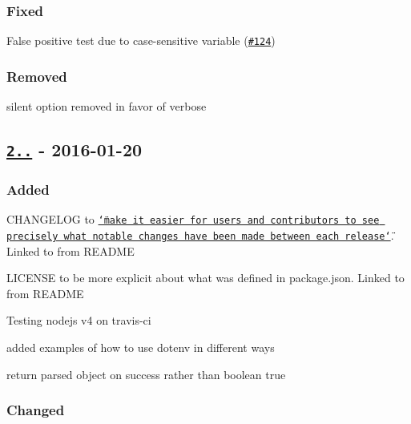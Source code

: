 \subsubsection*{Fixed}


\begin{DoxyItemize}
\item False positive test due to case-\/sensitive variable (\href{https://github.com/motdotla/dotenv/pull/124}{\tt \#124})
\end{DoxyItemize}

\subsubsection*{Removed}


\begin{DoxyItemize}
\item {\ttfamily silent} option removed in favor of {\ttfamily verbose}
\end{DoxyItemize}

\subsection*{\href{https://github.com/motdotla/dotenv/compare/v1.2.0...v2.0.0}{\tt 2..} -\/ 2016-\/01-\/20}

\subsubsection*{Added}


\begin{DoxyItemize}
\item C\+H\+A\+N\+G\+E\+L\+OG to \href{http://keepachangelog.com/}{\tt \char`\"{}make it easier for users and contributors to see precisely what notable changes have been made between each release\char`\"{}}. Linked to from R\+E\+A\+D\+ME
\item L\+I\+C\+E\+N\+SE to be more explicit about what was defined in {\ttfamily package.\+json}. Linked to from R\+E\+A\+D\+ME
\item Testing nodejs v4 on travis-\/ci
\item added examples of how to use dotenv in different ways
\item return parsed object on success rather than boolean true
\end{DoxyItemize}

\subsubsection*{Changed}


